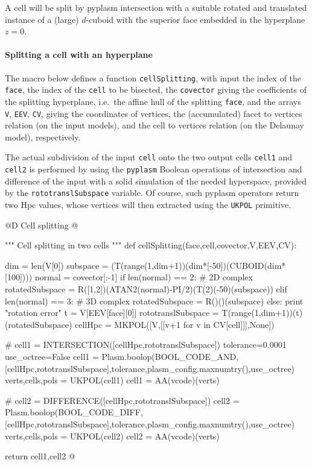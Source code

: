 \documentclass[11pt,oneside]{article}	%
\begin{document}
A cell will be split by pyplasm intersection with a suitable rotated and translated instance of a (large) $d$-cuboid with the superior face embedded in the hyperplane $z=0$.

\paragraph{Splitting a cell with an hyperplane}
The macro below defines a function \texttt{cellSplitting}, with input the index of the \texttt{face}, the index of the \texttt{cell} to be bisected, the \texttt{covector} giving the coefficients of the splitting hyperplane, i.e.~the affine hull of the splitting \texttt{face}, and the arrays \texttt{V}, \texttt{EEV}, \texttt{CV}, giving the coordinates of vertices, the (accumulated) facet to vertices relation (on the input models), and the cell to vertices relation (on the Delaunay model), respectively. 

The actual subdivision of the input \texttt{cell} onto the two output cells \texttt{cell1} and \texttt{cell2} is performed by using the \texttt{pyplasm} Boolean operations of intersection and difference of the input with a solid simulation of the needed hyperspace, provided by the \texttt{rototranslSubspace} variable. Of course, such pyplasm operators return two Hpc values, whose vertices will then extracted using the \texttt{UKPOL} primitive.

@D Cell splitting
@{""" Cell splitting in two cells """
def cellSplitting(face,cell,covector,V,EEV,CV):

	dim = len(V[0])
	subspace = (T(range(1,dim+1))(dim*[-50])(CUBOID(dim*[100])))
	normal = covector[:-1]
	if len(normal) == 2:  # 2D complex
		rotatedSubspace = R([1,2])(ATAN2(normal)-PI/2)(T(2)(-50)(subspace))
	elif len(normal) == 3:  # 3D complex
		rotatedSubspace = R()()(subspace)
	else: print "rotation error"
	t = V[EEV[face][0]]
	rototranslSubspace = T(range(1,dim+1))(t)(rotatedSubspace)
	cellHpc = MKPOL([V,[[v+1 for v in CV[cell]]],None])
	
	# cell1 = INTERSECTION([cellHpc,rototranslSubspace])
	tolerance=0.0001
	use_octree=False
	cell1 = Plasm.boolop(BOOL_CODE_AND, 
		[cellHpc,rototranslSubspace],tolerance,plasm_config.maxnumtry(),use_octree)
	verts,cells,pols = UKPOL(cell1)
	cell1 = AA(vcode)(verts)

	# cell2 = DIFFERENCE([cellHpc,rototranslSubspace])	
	cell2 = Plasm.boolop(BOOL_CODE_DIFF, 
		[cellHpc,rototranslSubspace],tolerance,plasm_config.maxnumtry(),use_octree)
	verts,cells,pols = UKPOL(cell2)
	cell2 = AA(vcode)(verts)

	return cell1,cell2
@}
\end{document}
